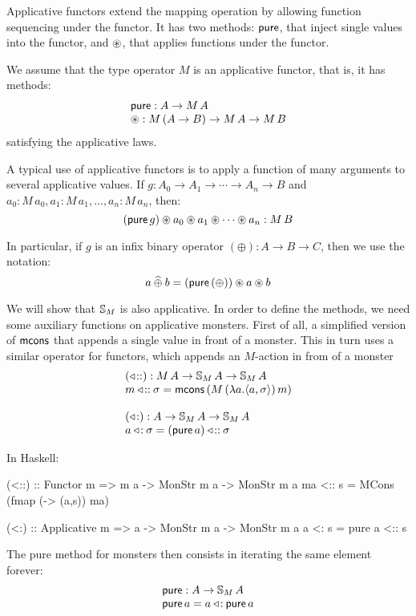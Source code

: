 Applicative functors \cite{mcbride/paterson:2008}
extend the mapping operation by allowing function sequencing under the functor.
It has two methods: $\mathsf{pure}$, that inject single values into the functor, and $\circledast$, that applies functions under the functor.

We assume that the type operator $M$ is an applicative functor, that is, it has methods:
$$
\begin{array}{l}
\mathsf{pure} : A \rightarrow M\,A\\
\circledast: M\,(A\rightarrow B) \rightarrow M\,A \rightarrow M\,B
\end{array}
$$
satisfying the applicative laws.

A typical use of applicative functors is to apply a function of many arguments to several applicative values.
If $g:A_0\rightarrow A_1 \rightarrow \cdots \rightarrow A_n \rightarrow B$ and $a_0:M\,a_0, a_1:M\,a_1, \ldots, a_n:M\,a_n$, then:
$$
(\mathsf{pure}\,g) \circledast a_0 \circledast a_1 \circledast \cdots \circledast a_n : M\,B
$$

In particular, if $g$ is an infix binary operator $(\oplus) : A \rightarrow B \rightarrow C$, then we use the notation:
$$
a \mathbin{\widehat{\oplus}} b = (\mathsf{pure}\,(\oplus)) \circledast a \circledast b
$$

We will show that $\mathbb{S}_{M}$ is also applicative.
In order to define the methods, we need some auxiliary functions on applicative monsters.
First of all, a simplified version of $\mathsf{mcons}$ that appends a single value in front of a monster.
This in turn uses a similar operator for functors, which appends an $M$-action in from of a monster
$$
\begin{array}{l}
(\mathbin{\triangleleft\!::}): M\,A \rightarrow \mathbb{S}_{M}\,A \rightarrow \mathbb{S}_{M}\,A\\
m \mathbin{\triangleleft\!::} \sigma = \mathsf{mcons}\, (M\,(\lambda a. \langle a, \sigma\rangle)\,m)\\
\,\\
(\mathbin{\triangleleft\!:}): A \rightarrow \mathbb{S}_{M}\,A \rightarrow \mathbb{S}_{M}\,A\\
a \mathbin{\triangleleft\!:} \sigma = (\mathsf{pure}\, a) \mathbin{\triangleleft\!::} \sigma
\end{array}
$$

In Haskell:
\begin{haskell}
(<::) :: Functor m => m a -> MonStr m a -> MonStr m a
ma <:: s = MCons (fmap (\a -> (a,s)) ma)

(<:) :: Applicative m => a -> MonStr m a -> MonStr m a
a <: s = pure a <:: s
\end{haskell}

The pure method for monsters then consists in iterating the same element forever:
$$
\begin{array}{l}
\mathsf{pure} : A \rightarrow \mathbb{S}_{M}\,A\\
\mathsf{pure}\,a = a \mathbin{\triangleleft\!:} \mathsf{pure}\,a
\end{array}
$$

